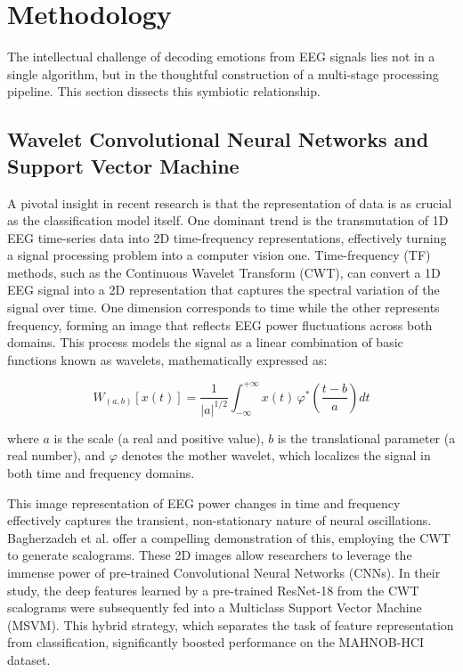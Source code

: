 \documentclass[conference]{IEEEtran}
\begin{document}
\section{Methodology}
The intellectual challenge of decoding emotions from EEG signals lies not in a single algorithm, but in the thoughtful construction of a multi-stage processing pipeline. This section dissects this symbiotic relationship.

\subsection{Wavelet Convolutional Neural Networks and Support Vector Machine}
A pivotal insight in recent research is that the representation of data is as crucial as the classification model itself. One dominant trend is the transmutation of 1D EEG time-series data into 2D time-frequency representations, effectively turning a signal processing problem into a computer vision one. Time-frequency (TF) methods, such as the Continuous Wavelet Transform (CWT), can convert a 1D EEG signal into a 2D representation that captures the spectral variation of the signal over time. One dimension corresponds to time while the other represents frequency, forming an image that reflects EEG power fluctuations across both domains. This process models the signal as a linear combination of basic functions known as wavelets, mathematically expressed as:

\begin{equation}
W_{(a,b)}[x(t)] = \frac{1}{|a|^{1/2}} \int_{-\infty}^{+\infty} x(t)\,\varphi^{*}\!\left(\frac{t - b}{a}\right) dt
\end{equation}

where \(a\) is the scale (a real and positive value), \(b\) is the translational parameter (a real number), and \(\varphi\) denotes the mother wavelet, which localizes the signal in both time and frequency domains.

This image representation of EEG power changes in time and frequency effectively captures the transient, non-stationary nature of neural oscillations. Bagherzadeh et al. \cite{b1} offer a compelling demonstration of this, employing the CWT to generate scalograms. These 2D images allow researchers to leverage the immense power of pre-trained Convolutional Neural Networks (CNNs). In their study, the deep features learned by a pre-trained ResNet-18 from the CWT scalograms were subsequently fed into a Multiclass Support Vector Machine (MSVM). This hybrid strategy, which separates the task of feature representation from classification, significantly boosted performance on the MAHNOB-HCI dataset.
\end{document}
